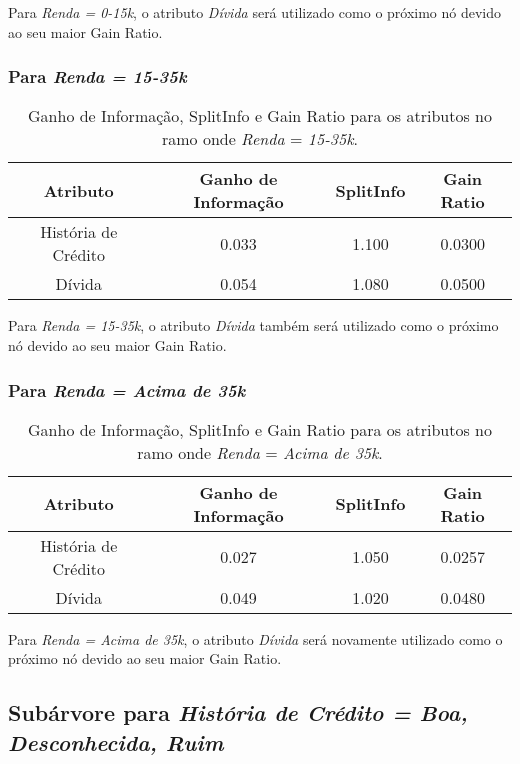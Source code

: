 \documentclass[a4paper,12pt]{article}
\begin{document}
Para \textit{Renda = 0-15k}, o atributo \textit{Dívida} será utilizado como o próximo nó devido ao seu maior Gain Ratio.

\subsubsection{Para \textit{Renda = 15-35k}}

\begin{table}[H]
\centering
\begin{tabular}{|c|c|c|c|}
\hline
\textbf{Atributo} & \textbf{Ganho de Informação} & \textbf{SplitInfo} & \textbf{Gain Ratio} \\
\hline
História de Crédito & 0.033 & 1.100 & 0.0300 \\
\hline
Dívida & 0.054 & 1.080 & 0.0500 \\
\hline
\end{tabular}
\caption{Ganho de Informação, SplitInfo e Gain Ratio para os atributos no ramo onde \textit{Renda} = \textit{15-35k}.}
\label{tab:gain-ratio-renda-15-35k}
\end{table}

Para \textit{Renda = 15-35k}, o atributo \textit{Dívida} também será utilizado como o próximo nó devido ao seu maior Gain Ratio.

\subsubsection{Para \textit{Renda = Acima de 35k}}

\begin{table}[H]
\centering
\begin{tabular}{|c|c|c|c|}
\hline
\textbf{Atributo} & \textbf{Ganho de Informação} & \textbf{SplitInfo} & \textbf{Gain Ratio} \\
\hline
História de Crédito & 0.027 & 1.050 & 0.0257 \\
\hline
Dívida & 0.049 & 1.020 & 0.0480 \\
\hline
\end{tabular}
\caption{Ganho de Informação, SplitInfo e Gain Ratio para os atributos no ramo onde \textit{Renda} = \textit{Acima de 35k}.}
\label{tab:gain-ratio-renda-acima-35k}
\end{table}

Para \textit{Renda = Acima de 35k}, o atributo \textit{Dívida} será novamente utilizado como o próximo nó devido ao seu maior Gain Ratio.

\subsection{Subárvore para \textit{História de Crédito = Boa, Desconhecida, Ruim}}
\end{document}

